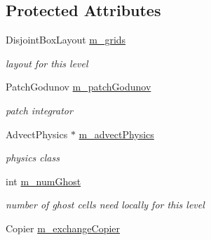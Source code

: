 \subsection*{Protected Attributes}
\begin{DoxyCompactItemize}
\item 
\hypertarget{class_level_advect_a7e53aeeaa7bcd9e5371e5edf0a91956d}{Disjoint\-Box\-Layout \hyperlink{class_level_advect_a7e53aeeaa7bcd9e5371e5edf0a91956d}{m\-\_\-grids}}\label{class_level_advect_a7e53aeeaa7bcd9e5371e5edf0a91956d}

\begin{DoxyCompactList}\small\item\em layout for this level \end{DoxyCompactList}\item 
\hypertarget{class_level_advect_a5b9741fc6de32a21ea3dfa449288c6ac}{Patch\-Godunov \hyperlink{class_level_advect_a5b9741fc6de32a21ea3dfa449288c6ac}{m\-\_\-patch\-Godunov}}\label{class_level_advect_a5b9741fc6de32a21ea3dfa449288c6ac}

\begin{DoxyCompactList}\small\item\em patch integrator \end{DoxyCompactList}\item 
\hypertarget{class_level_advect_a26ff856333114236e82dbcfd712ba912}{Advect\-Physics $\ast$ \hyperlink{class_level_advect_a26ff856333114236e82dbcfd712ba912}{m\-\_\-advect\-Physics}}\label{class_level_advect_a26ff856333114236e82dbcfd712ba912}

\begin{DoxyCompactList}\small\item\em physics class \end{DoxyCompactList}\item 
\hypertarget{class_level_advect_a68fb9b1ed68cf6f6965e082e8f18e3ba}{int \hyperlink{class_level_advect_a68fb9b1ed68cf6f6965e082e8f18e3ba}{m\-\_\-num\-Ghost}}\label{class_level_advect_a68fb9b1ed68cf6f6965e082e8f18e3ba}

\begin{DoxyCompactList}\small\item\em number of ghost cells need locally for this level \end{DoxyCompactList}\item 
\hypertarget{class_level_advect_a752c22422040ef2e8b3d7e391155a0a7}{Copier \hyperlink{class_level_advect_a752c22422040ef2e8b3d7e391155a0a7}{m\-\_\-exchange\-Copier}}\label{class_level_advect_a752c22422040ef2e8b3d7e391155a0a7}


\end{DoxyCompactItemize}
